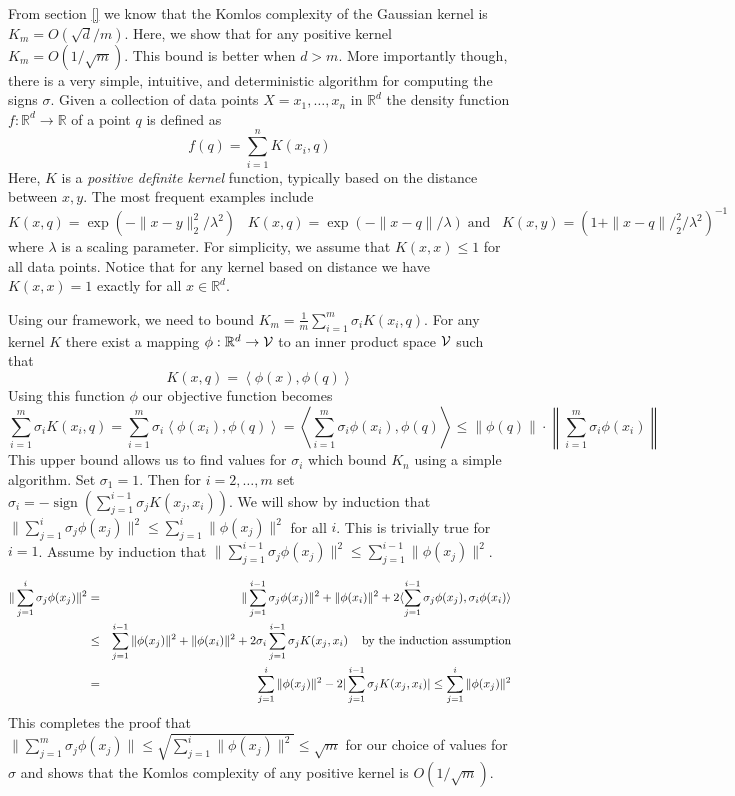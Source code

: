 \documentclass[anon,12pt]{colt2019} %
\newcommand{\ip}[1]{\left \langle #1 \right \rangle}
\newcommand{\R}{\mathbb{R}}
\begin{document}
From section \ref{} we know that the Komlos complexity of the Gaussian kernel is $K_m = O(\sqrt{d}/m)$. Here, we show that for any positive kernel $K_m = O(1/\sqrt{m})$. This bound is better when $d > m$. More importantly though, there is a very simple, intuitive, and deterministic algorithm for computing the signs $\sigma$. 
Given a collection of data points $X = x_1,\ldots, x_n$ in $\R^d$ the density function $f: \R^d \rightarrow \R$ of a point $q$ is defined as 
$$ f(q) = \sum_{i=1}^{n} K(x_i,q) $$
Here, $K$ is a \emph{positive definite kernel} function, typically based on the distance between $x,y$. The most frequent examples include
$$ K(x,q) = \exp(- \|x-y\|_2^2/\lambda^2)\;\;\; K(x,q) = \exp(- \|x-q\|/\lambda) \; \mbox{and}\;\;\; K(x,y) = (1+\|x-q\|/_2^2/\lambda^2)^{-1}$$
where $\lambda$ is a scaling parameter. For simplicity, we assume that $K(x,x) \leq 1$ for all data points. Notice that for any kernel based on distance we have $K(x,x)=1$ exactly for all $x \in \R^d$.

Using our framework, we need to bound $K_m = \frac{1}{m}\sum_{i=1}^m \sigma_i K(x_i,q)$. For any kernel $K$ there exist a mapping $\phi: \R^d \to {\cal V}$ to an inner product space $\cal V$ such that 
$$ K(x,q) = \ip{\phi(x), \phi(q)} $$
Using this function $\phi$ our objective function becomes
\[
\sum_{i=1}^m \sigma_i K(x_i,q) = \sum_{i=1}^m \sigma_i \ip{\phi(x_i), \phi(q)} =  \ip{ \sum_{i=1}^m \sigma_i \phi(x_i), \phi(q)} \leq  \|\phi(q)\| \cdot \left\|  \sum_{i=1}^m \sigma_i \phi(x_i) \right\| %
\]
This upper bound allows us to find values for $\sigma_i$ which bound $K_n$ using a simple algorithm.
Set $\sigma_1 = 1$. Then for $i=2,\ldots,m$ set $\sigma_i = -\operatorname{sign} (\sum_{j=1}^{i-1}\sigma_j  K(x_j, x_i))$.
We will show by induction that $\| \sum_{j=1}^i \sigma_j \phi(x_j) \|^2 \le \sum_{j=1}^i \|\phi(x_j)\|^2$ for all $i$.
This is trivially true for $i=1$. 
Assume by induction that $\| \sum_{j=1}^{i-1} \sigma_j \phi(x_j)\|^2 \le \sum_{j=1}^{i-1} \|\phi(x_j)\|^2$.

\begin{eqnarray*}
\| \sum_{j=1}^{i}\sigma_j \phi(x_j)\|^2 &=& \|\sum_{j=1}^{i-1}\sigma_j \phi(x_j)\|^2 + \|\phi(x_i)\|^2 + 2\langle \sum_{j=1}^{i-1}\sigma_j \phi(x_j), \sigma_i \phi(x_i)\rangle \\
&\le& \sum_{j=1}^{i-1} \|\phi(x_j)\|^2 + \|\phi(x_i)\|^2 + 2\sigma_i \sum_{j=1}^{i-1}\sigma_j K(x_j, x_i) \mbox{\;\;\; by the induction assumption}\\ 
&=& \sum_{j=1}^{i} \|\phi(x_j)\|^2 - 2|\sum_{j=1}^{i-1}\sigma_j K(x_j, x_i)| \le \sum_{j=1}^{i} \|\phi(x_j)\|^2
\end{eqnarray*}
This completes the proof that $\| \sum_{j=1}^{m}\sigma_j \phi(x_j)\| \le \sqrt{\sum_{j=1}^{i} \|\phi(x_j)\|^2} \le \sqrt{m}$ for our choice of values for $\sigma$ and shows that the Komlos complexity of any positive kernel is $O(1/\sqrt{m})$. 
\end{document}
